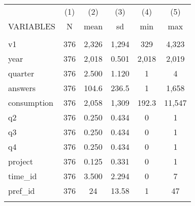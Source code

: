\documentclass[]{article}
\begin{document}
\begin{tabular}{lccccc} \hline
 & (1) & (2) & (3) & (4) & (5) \\
VARIABLES & N & mean & sd & min & max \\ \hline
 &  &  &  &  &  \\
v1 & 376 & 2,326 & 1,294 & 329 & 4,323 \\
year & 376 & 2,018 & 0.501 & 2,018 & 2,019 \\
quarter & 376 & 2.500 & 1.120 & 1 & 4 \\
answers & 376 & 104.6 & 236.5 & 1 & 1,658 \\
consumption & 376 & 2,058 & 1,309 & 192.3 & 11,547 \\
q2 & 376 & 0.250 & 0.434 & 0 & 1 \\
q3 & 376 & 0.250 & 0.434 & 0 & 1 \\
q4 & 376 & 0.250 & 0.434 & 0 & 1 \\
project & 376 & 0.125 & 0.331 & 0 & 1 \\
time\_id & 376 & 3.500 & 2.294 & 0 & 7 \\
pref\_id & 376 & 24 & 13.58 & 1 & 47 \\
 &  &  &  &  &  \\ \hline
\end{tabular}
\end{document}
